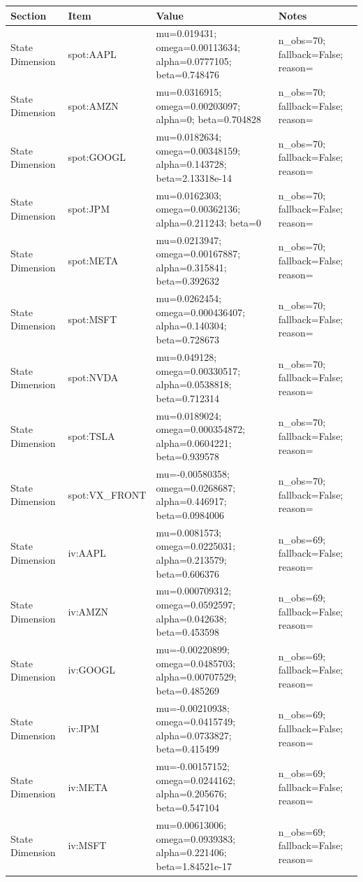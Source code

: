 \begin{tabular}{llll}
\toprule
Section & Item & Value & Notes \\
\midrule
State Dimension & spot:AAPL & mu=0.019431; omega=0.00113634; alpha=0.0777105; beta=0.748476 & n\_obs=70; fallback=False; reason= \\
State Dimension & spot:AMZN & mu=0.0316915; omega=0.00203097; alpha=0; beta=0.704828 & n\_obs=70; fallback=False; reason= \\
State Dimension & spot:GOOGL & mu=0.0182634; omega=0.00348159; alpha=0.143728; beta=2.13318e-14 & n\_obs=70; fallback=False; reason= \\
State Dimension & spot:JPM & mu=0.0162303; omega=0.00362136; alpha=0.211243; beta=0 & n\_obs=70; fallback=False; reason= \\
State Dimension & spot:META & mu=0.0213947; omega=0.00167887; alpha=0.315841; beta=0.392632 & n\_obs=70; fallback=False; reason= \\
State Dimension & spot:MSFT & mu=0.0262454; omega=0.000436407; alpha=0.140304; beta=0.728673 & n\_obs=70; fallback=False; reason= \\
State Dimension & spot:NVDA & mu=0.049128; omega=0.00330517; alpha=0.0538818; beta=0.712314 & n\_obs=70; fallback=False; reason= \\
State Dimension & spot:TSLA & mu=0.0189024; omega=0.000354872; alpha=0.0604221; beta=0.939578 & n\_obs=70; fallback=False; reason= \\
State Dimension & spot:VX\_FRONT & mu=-0.00580358; omega=0.0268687; alpha=0.446917; beta=0.0984006 & n\_obs=70; fallback=False; reason= \\
State Dimension & iv:AAPL & mu=0.0081573; omega=0.0225031; alpha=0.213579; beta=0.606376 & n\_obs=69; fallback=False; reason= \\
State Dimension & iv:AMZN & mu=0.000709312; omega=0.0592597; alpha=0.042638; beta=0.453598 & n\_obs=69; fallback=False; reason= \\
State Dimension & iv:GOOGL & mu=-0.00220899; omega=0.0485703; alpha=0.00707529; beta=0.485269 & n\_obs=69; fallback=False; reason= \\
State Dimension & iv:JPM & mu=-0.00210938; omega=0.0415749; alpha=0.0733827; beta=0.415499 & n\_obs=69; fallback=False; reason= \\
State Dimension & iv:META & mu=-0.00157152; omega=0.0244162; alpha=0.205676; beta=0.547104 & n\_obs=69; fallback=False; reason= \\
State Dimension & iv:MSFT & mu=0.00613006; omega=0.0939383; alpha=0.221406; beta=1.84521e-17 & n\_obs=69; fallback=False; reason= \\

\end{tabular}
